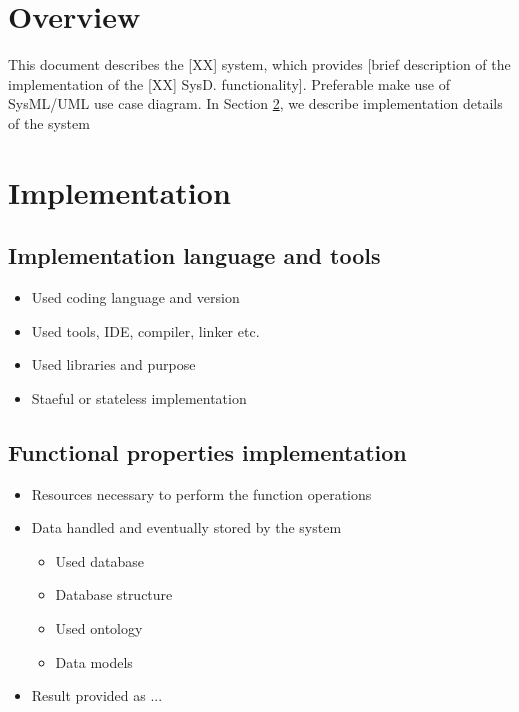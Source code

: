 \documentclass[a4paper]{arrowhead}
\begin{document}
\section{Overview}
\label{sec:overview}
\color{red}
This document describes the [XX] system, which provides [brief
description of the implementation of the [XX] SysD.
functionality]. Preferable make use of SysML/UML 
use case diagram. 
\color{black}
In Section \ref{Implementation}, we describe implementation details of
the system



\newpage

\section{Implementation}
\label{Implementation}

\subsection {Implementation language and tools}
\color{red}
\begin{itemize}
\item Used coding language and version
\item Used tools, IDE, compiler, linker etc.
\item Used libraries and purpose
\item Staeful or stateless implementation   
\end{itemize} 
\color{black}

\subsection {Functional properties implementation}
\color{red}
  \begin{itemize}
  \item Resources necessary to perform the function operations
  \item Data handled and eventually stored by the system
    \begin{itemize}
    \item Used database
    \item Database structure
    \item Used ontology
    \item Data models
    \end{itemize}
  \item Result provided as ...
  \end{itemize}
\color{black}
\end{document}
